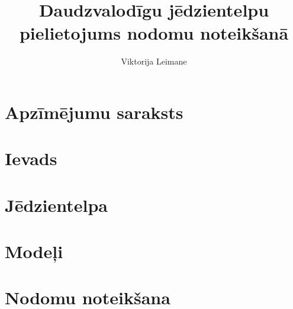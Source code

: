 \documentclass[12pt,oneside]{LuThesis}
\title{Daudzvalodīgu jēdzientelpu pielietojums nodomu noteikšanā}
\author{Viktorija Leimane}
\begin{document}
\maketitle

%

%

\tableofcontents


\chapter*{Apzīmējumu saraksts}



\chapter*{Ievads}



\chapter{Jēdzientelpa}


\chapter{Modeļi}


\chapter{Nodomu noteikšana}


% 
\end{document}
